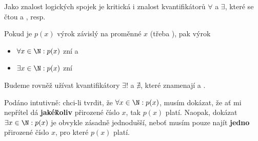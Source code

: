 Jako znalost logických spojek je kritická i znalost kvantifikátorů $ \forall $ 
a $ \exists $, které se čtou  a , resp.

Pokud je $p(x)$ výrok závislý na proměnné $x$ (třeba ), pak
výrok
\begin{itemize}
 \item $ \forall x \in \N: p(x)$ zní  a
 \item $ \exists x \in \N: p(x)$ zní 
\end{itemize}
Budeme rovněž užívat kvantifikátory $ \exists!$ a $\nexists$, které znamenají
 a .

Podáno intutivně: chci-li tvrdit, že $ \forall x \in \N:p(x)$, musím dokázat,
že ať mi nepřítel dá \textbf{jakéḱoliv} přirozené číslo $x$, tak $p(x)$ platí.
Naopak, dokázat $ \exists x \in \N: p(x)$ je obvykle zásadně jednodušší, neboť
musím pouze najít \textbf{jedno} přirozené číslo $x$, pro které $p(x)$ platí.
